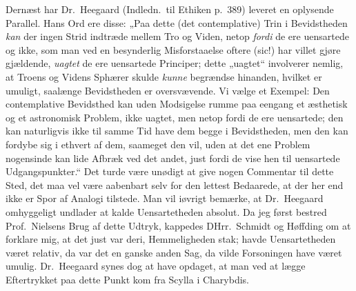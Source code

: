 Dernæst har Dr.\ Heegaard (Indledn.\ til Ethiken p.\ 389) leveret en
oplysende Parallel. Hans Ord ere disse: „Paa dette (det contemplative) Trin i
Bevidstheden \emph{kan} der ingen Strid indtræde mellem Tro og Viden, netop
\emph{fordi} de ere uensartede og ikke, som man ved en besynderlig
Misforstaaelse oftere (sic!) har villet gjøre gjældende, \emph{uagtet} de ere
uensartede
Principer; dette „uagtet“ involverer nemlig, at Troens og Videns
Sphærer skulde \emph{kunne} begrændse hinanden, hvilket er umuligt, saalænge
Bevidstheden er oversvævende. Vi vælge et Exempel: Den contemplative
Bevidsthed kan uden Modsigelse rumme paa eengang et æsthetisk og et
astronomisk Problem, ikke uagtet, men netop fordi de ere uensartede; den kan
naturligvis ikke til samme Tid have dem begge i Bevidstheden, men den kan
fordybe sig i ethvert af dem, saameget den vil, uden at det ene Problem
nogensinde kan lide Afbræk ved det andet, just fordi de vise hen til
uensartede Udgangspunkter.“ Det turde være unødigt at give nogen Commentar
til dette Sted, det maa vel være aabenbart selv for den lettest Bedaarede, at
der her end ikke er Spor af Analogi tilstede. Man vil iøvrigt bemærke, at
Dr.\ Heegaard omhyggeligt undlader at kalde Uensartetheden absolut. Da jeg
først bestred Prof.\ Nielsens Brug af dette Udtryk, kappedes DHrr.\ Schmidt
og Høffding om at forklare mig, at det just var deri, Hemmeligheden stak;
havde Uensartetheden været relativ, da var det en ganske anden Sag, da vilde
Forsoningen have været umulig. Dr.\ Heegaard synes dog at have opdaget, at
man ved at lægge Eftertrykket paa dette Punkt kom fra Scylla i Charybdis.

